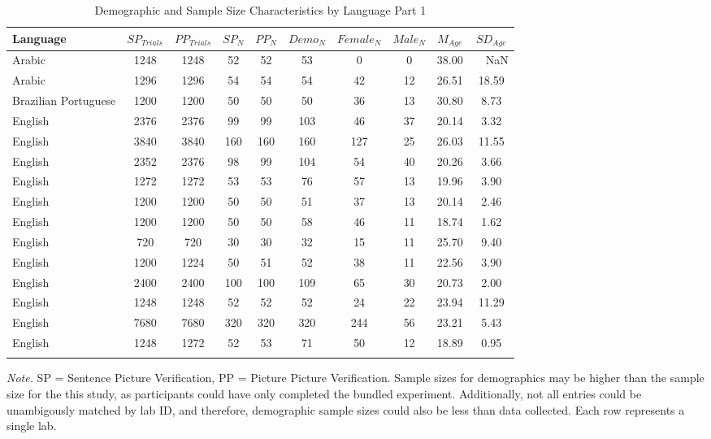 \documentclass[
  man,mask,floatsintext]{apa7}
\begin{document}
\begin{table}[tbp]

\begin{center}
\begin{threeparttable}

\caption{\label{tab:print-part1}Demographic and Sample Size Characteristics by Language Part 1}

\footnotesize{

\begin{tabular}{lccccccccc}
\toprule
Language & $SP_{Trials}$ & $PP_{Trials}$ & $SP_N$ & $PP_N$ & $Demo_N$ & $Female_N$ & $Male_N$ & $M_{Age}$ & $SD_{Age}$\\
\midrule
Arabic & 1248 & 1248 & 52 & 52 & 53 & 0 & 0 & 38.00 & \ \ NaN\\
Arabic & 1296 & 1296 & 54 & 54 & 54 & 42 & 12 & 26.51 & 18.59\\
Brazilian Portuguese & 1200 & 1200 & 50 & 50 & 50 & 36 & 13 & 30.80 & 8.73\\
English & 2376 & 2376 & 99 & 99 & 103 & 46 & 37 & 20.14 & 3.32\\
English & 3840 & 3840 & 160 & 160 & 160 & 127 & 25 & 26.03 & 11.55\\
English & 2352 & 2376 & 98 & 99 & 104 & 54 & 40 & 20.26 & 3.66\\
English & 1272 & 1272 & 53 & 53 & 76 & 57 & 13 & 19.96 & 3.90\\
English & 1200 & 1200 & 50 & 50 & 51 & 37 & 13 & 20.14 & 2.46\\
English & 1200 & 1200 & 50 & 50 & 58 & 46 & 11 & 18.74 & 1.62\\
English & 720 & 720 & 30 & 30 & 32 & 15 & 11 & 25.70 & 9.40\\
English & 1200 & 1224 & 50 & 51 & 52 & 38 & 11 & 22.56 & 3.90\\
English & 2400 & 2400 & 100 & 100 & 109 & 65 & 30 & 20.73 & 2.00\\
English & 1248 & 1248 & 52 & 52 & 52 & 24 & 22 & 23.94 & 11.29\\
English & 7680 & 7680 & 320 & 320 & 320 & 244 & 56 & 23.21 & 5.43\\
English & 1248 & 1272 & 52 & 53 & 71 & 50 & 12 & 18.89 & 0.95\\
\bottomrule
\addlinespace
\end{tabular}

}

\begin{tablenotes}[para]
\normalsize{\textit{Note.} SP = Sentence Picture Verification, PP = Picture Picture Verification. Sample sizes for demographics may be higher than the sample size for the this study, as participants could have only completed the bundled experiment. Additionally, not all entries could be unambigously matched by lab ID, and therefore, demographic sample sizes could also be less than data collected. Each row represents a single lab.}
\end{tablenotes}

\end{threeparttable}
\end{center}

\end{table}
\end{document}

